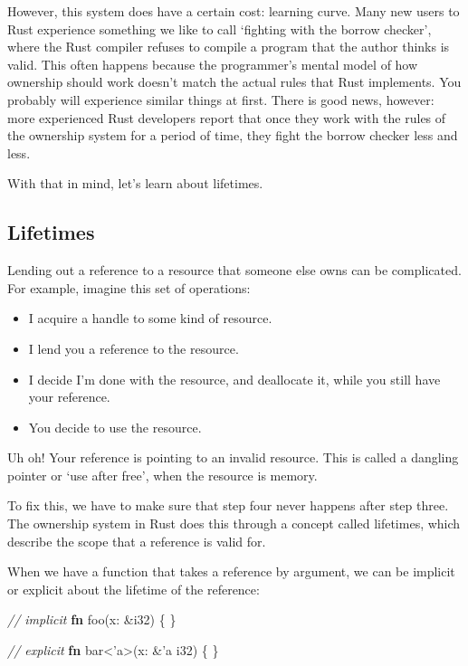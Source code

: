 \documentclass[a4paper,]{book}
\newenvironment{Shaded}{\begin{snugshade}}{\end{snugshade}}
\newcommand{\KeywordTok}[1]{\textcolor[rgb]{0.13,0.29,0.53}{\textbf{{#1}}}}
\newcommand{\DataTypeTok}[1]{\textcolor[rgb]{0.13,0.29,0.53}{{#1}}}
\newcommand{\CommentTok}[1]{\textcolor[rgb]{0.56,0.35,0.01}{\textit{{#1}}}}
\newcommand{\OtherTok}[1]{\textcolor[rgb]{0.56,0.35,0.01}{{#1}}}
\newcommand{\NormalTok}[1]{{#1}}
\providecommand{\tightlist}{%
  \setlength{\itemsep}{0pt}\setlength{\parskip}{0pt}}
\begin{document}
However, this system does have a certain cost: learning curve. Many new
users to Rust experience something we like to call `fighting with the
borrow checker', where the Rust compiler refuses to compile a program
that the author thinks is valid. This often happens because the
programmer's mental model of how ownership should work doesn't match the
actual rules that Rust implements. You probably will experience similar
things at first. There is good news, however: more experienced Rust
developers report that once they work with the rules of the ownership
system for a period of time, they fight the borrow checker less and
less.

With that in mind, let's learn about lifetimes.

\subsection{Lifetimes}\label{lifetimes}

Lending out a reference to a resource that someone else owns can be
complicated. For example, imagine this set of operations:

\begin{itemize}
\tightlist
\item
  I acquire a handle to some kind of resource.
\item
  I lend you a reference to the resource.
\item
  I decide I'm done with the resource, and deallocate it, while you
  still have your reference.
\item
  You decide to use the resource.
\end{itemize}

Uh oh! Your reference is pointing to an invalid resource. This is called
a dangling pointer or `use after free', when the resource is memory.

To fix this, we have to make sure that step four never happens after
step three. The ownership system in Rust does this through a concept
called lifetimes, which describe the scope that a reference is valid
for.

When we have a function that takes a reference by argument, we can be
implicit or explicit about the lifetime of the reference:

\begin{Shaded}
\begin{Highlighting}[]
\CommentTok{// implicit}
\KeywordTok{fn} \NormalTok{foo(x: &}\DataTypeTok{i32}\NormalTok{) \{}
\NormalTok{\}}

\CommentTok{// explicit}
\KeywordTok{fn} \NormalTok{bar<}\OtherTok{'a}\NormalTok{>(x: &}\OtherTok{'a} \DataTypeTok{i32}\NormalTok{) \{}
\NormalTok{\}}
\end{Highlighting}
\end{Shaded}
\end{document}
